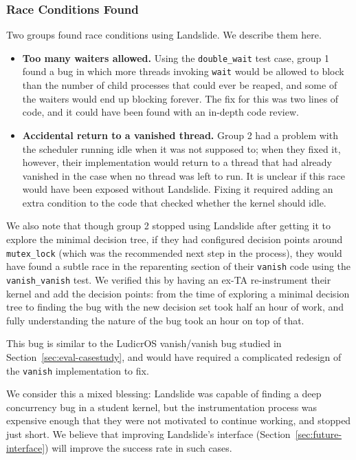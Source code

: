 \subsubsection{Race Conditions Found}

Two groups found race conditions using Landslide. We describe them here.

\begin{itemize}
	\item {\bf Too many waiters allowed.} Using the \texttt{double\_wait} test case, group 1 found a bug in which more threads invoking \texttt{wait} would be allowed to block than the number of child processes that could ever be reaped, and some of the waiters would end up blocking forever. The fix for this was two lines of code, and it could have been found with an in-depth code review.
	\item {\bf Accidental return to a vanished thread.} Group 2 had a problem with the scheduler running idle when it was not supposed to; when they fixed it, however, their implementation would return to a thread that had already vanished in the case when no thread was left to run. It is unclear if this race would have been exposed without Landslide. Fixing it required adding an extra condition to the code that checked whether the kernel should idle.
\end{itemize}

We also note that though group 2 stopped using Landslide after getting it to explore the minimal decision tree, if they had configured decision points around \texttt{mutex\_lock} (which was the recommended next step in the process), they would have found a subtle race in the reparenting section of their \texttt{vanish} code using the \texttt{vanish\_vanish} test. We verified this by having an ex-TA re-instrument their kernel and add the decision points: from the time of exploring a minimal decision tree to finding the bug with the new decision set took half an hour of work, and fully understanding the nature of the bug took an hour on top of that.

This bug is similar to the LudicrOS vanish/vanish bug studied in Section~\ref{sec:eval-casestudy}, and would have required a complicated redesign of the \texttt{vanish} implementation to fix.

We consider this a mixed blessing: Landslide was capable of finding a deep concurrency bug in a student kernel, but the instrumentation process was expensive enough that they were not motivated to continue working, and stopped just short. We believe that improving Landslide's interface (Section~\ref{sec:future-interface}) will improve the success rate in such cases.

